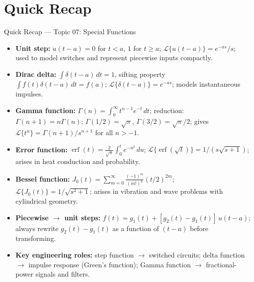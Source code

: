 \documentclass[12pt,a4paper]{article}
\begin{document}
\section{Quick Recap}

\begin{learnbox}{Quick Recap --- Topic 07: Special Functions}
\begin{itemize}
  \item \textbf{Unit step:} $u(t-a) = 0$ for $t < a$, $1$ for $t \geq a$;
        $\mathcal{L}\{u(t-a)\} = e^{-as}/s$; used to model switches and
        represent piecewise inputs compactly.
  \item \textbf{Dirac delta:} $\int\delta(t-a)\,dt = 1$, sifting property
        $\int f(t)\delta(t-a)\,dt = f(a)$;
        $\mathcal{L}\{\delta(t-a)\} = e^{-as}$; models instantaneous impulses.
  \item \textbf{Gamma function:} $\Gamma(n) = \int_0^{\infty} t^{n-1}e^{-t}\,dt$;
        reduction: $\Gamma(n+1) = n\Gamma(n)$; $\Gamma(1/2)=\sqrt{\pi}$,
        $\Gamma(3/2)=\sqrt{\pi}/2$; gives
        $\mathcal{L}\{t^n\} = \Gamma(n+1)/s^{n+1}$ for all $n > -1$.
  \item \textbf{Error function:}
        $\operatorname{erf}(t) = \tfrac{2}{\sqrt{\pi}}\int_0^t e^{-u^2}\,du$;
        $\mathcal{L}\{\operatorname{erf}(\sqrt{t})\} = 1/(s\sqrt{s+1})$;
        arises in heat conduction and probability.
  \item \textbf{Bessel function:} $J_0(t) = \sum_{m=0}^{\infty}
        \tfrac{(-1)^m}{(m!)^2}(t/2)^{2m}$;
        $\mathcal{L}\{J_0(t)\} = 1/\sqrt{s^2+1}$; arises in vibration and wave
        problems with cylindrical geometry.
  \item \textbf{Piecewise $\to$ unit steps:}
        $f(t) = g_1(t) + [g_2(t)-g_1(t)]\,u(t-a)$; always rewrite
        $g_2(t)-g_1(t)$ as a function of $(t-a)$ before transforming.
  \item \textbf{Key engineering roles:} step function $\to$ switched circuits;
        delta function $\to$ impulse response (Green's function);
        Gamma function $\to$ fractional-power signals and filters.
\end{itemize}
\end{learnbox}
\end{document}
